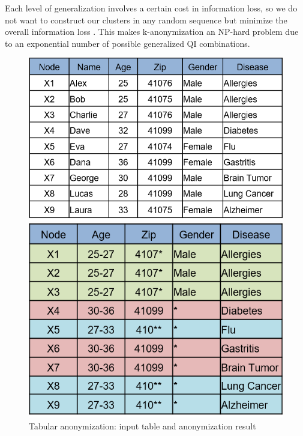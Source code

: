 \documentclass{llncs}
\begin{document}
Each level of generalization involves a certain cost in information loss, so we do not want to construct our clusters in any random sequence but minimize the overall information loss \cite{aggarwal2005approximation}. This makes k-anonymization an NP-hard problem due to an exponential number of possible generalized QI combinations.

\begin{figure}[!t]
	\centering
	\begin{minipage}[b]{0.535\textwidth}
		\includegraphics[width=\textwidth]{figures/anonym/k_anon_input}
	\end{minipage}
	\hfill
	\begin{minipage}[b]{0.448\textwidth}
		\includegraphics[width=\textwidth]{figures/anonym/k_anon_output}
	\end{minipage}
	\caption{Tabular anonymization: input table and anonymization result}
	\label{fig:anonymized_clusters}
\end{figure}
\end{document}
